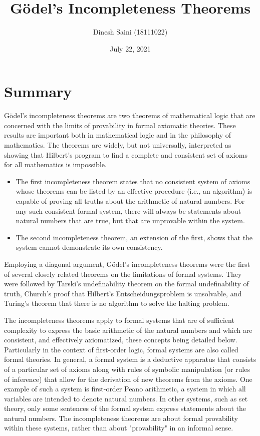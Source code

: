 \documentclass[12pt]{article}
\begin{document}
\title{Gödel's Incompleteness Theorems}
\author{Dinesh Saini (18111022)}
\date{July 22, 2021}
\maketitle



\section{Summary}

Gödel's incompleteness theorems are two theorems of mathematical logic that are concerned with the limits of provability in formal axiomatic theories. These results are important both in mathematical logic and in the philosophy of mathematics. The theorems are widely, but not universally, interpreted as showing that Hilbert's program to find a complete and consistent set of axioms for all mathematics is impossible.

\begin{itemize}

\item The first incompleteness theorem states that no consistent system of axioms whose theorems can be listed by an effective procedure (i.e., an algorithm) is capable of proving all truths about the arithmetic of natural numbers. For any such consistent formal system, there will always be statements about natural numbers that are true, but that are unprovable within the system.
\item The second incompleteness theorem, an extension of the first, shows that the system cannot demonstrate its own consistency.

\end{itemize}

Employing a diagonal argument, Gödel's incompleteness theorems were the first of several closely related theorems on the limitations of formal systems. They were followed by Tarski's undefinability theorem on the formal undefinability of truth, Church's proof that Hilbert's Entscheidungsproblem is unsolvable, and Turing's theorem that there is no algorithm to solve the halting problem.   \par

The incompleteness theorems apply to formal systems that are of sufficient complexity to express the basic arithmetic of the natural numbers and which are consistent, and effectively axiomatized, these concepts being detailed below. Particularly in the context of first-order logic, formal systems are also called formal theories. In general, a formal system is a deductive apparatus that consists of a particular set of axioms along with rules of symbolic manipulation (or rules of inference) that allow for the derivation of new theorems from the axioms. One example of such a system is first-order Peano arithmetic, a system in which all variables are intended to denote natural numbers. In other systems, such as set theory, only some sentences of the formal system express statements about the natural numbers. The incompleteness theorems are about formal provability within these systems, rather than about "provability" in an informal sense.
\end{document}
